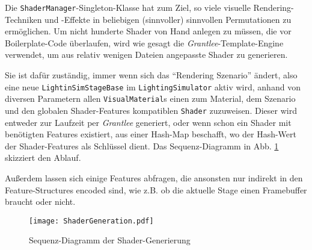 	
	Die \lstinline|ShaderManager|-Singleton-Klasse hat zum Ziel, so viele visuelle Rendering-Techniken und -Effekte 
	in beliebigen (sinnvoller) sinnvollen Permutationen zu ermöglichen. Um nicht hunderte Shader
	von Hand anlegen zu müssen, die vor Boilerplate-Code überlaufen, wird wie gesagt die
	\emph{Grantlee}-Template-Engine verwendet, um aus relativ wenigen Dateien angepasste Shader zu generieren.
	
	Sie ist dafür zuständig, immer wenn sich das "`Rendering Szenario"' ändert, also eine neue 
	\lstinline|LightinSimStageBase| im \lstinline|LightingSimulator| aktiv wird,  anhand von diversen Parametern
	allen \lstinline|VisualMaterial|s einen zum Material, dem Szenario und den globalen Shader-Features
	kompatiblen \lstinline|Shader| zuzuweisen. Dieser wird entweder zur Laufzeit
	per \emph{Grantlee} generiert, oder wenn schon ein Shader mit benötigten Features existiert, aus einer
	Hash-Map beschafft, wo der Hash-Wert der Shader-Features als Schlüssel dient.
	Das Sequenz-Diagramm in Abb. \ref{fig:shaderGen} skizziert den Ablauf.
	
	Außerdem lassen sich einige Features abfragen, die ansonsten nur indirekt in den Feature-Structures
	encoded sind, wie z.B. ob die aktuelle Stage einen Framebuffer braucht oder nicht.
	
	\begin{figure}[!h]
	\texttt{[image: ShaderGeneration.pdf]}
	\caption{Sequenz-Diagramm der Shader-Generierung}
	\label{fig:shaderGen}
	\end{figure}
	
